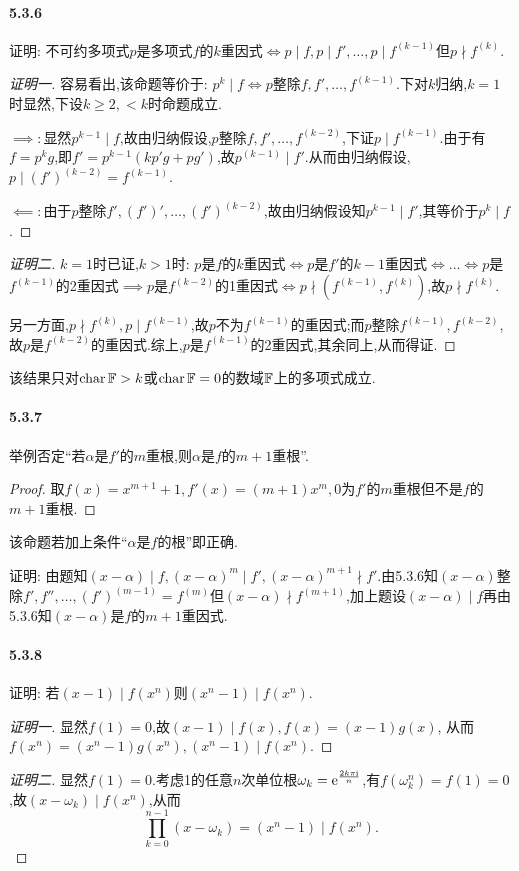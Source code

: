 \documentclass[11pt]{article}
\begin{document}
\paragraph{5.3.6}证明: 不可约多项式$p$是多项式$f$的$k$重因式$\iff p\mid f, p\mid f',\dots,p\mid f^{(k-1)}$但$p\nmid f^{(k)}$.
\begin{proof}[证明一]
    容易看出,该命题等价于: $p^k\mid f \iff p$整除$f, f',\dots, f^{(k-1)}$.下对$k$归纳,$k=1$时显然,下设$k\geq 2, <k$时命题成立.

    $\implies:$显然$p^{k-1}\mid f$,故由归纳假设,$p$整除$f,f',\dots,f^{(k-2)}$,下证$p\mid f^{(k-1)}$.由于有$f=p^kg$,即$f'=p^{k-1}(kp'g+pg')$,故$p^{(k-1)}\mid f'$.从而由归纳假设,$p\mid (f')^{(k-2)}=f^{(k-1)}$.
    
    $\impliedby:$由于$p$整除$f',(f')',\dots,(f')^{(k-2)}$,故由归纳假设知$p^{k-1}\mid f'$,其等价于$p^k\mid f$.
\end{proof}
\begin{proof}[证明二]
    $k=1$时已证,$k>1$时: $p$是$f$的$k$重因式$\iff p$是$f'$的$k-1$重因式$\iff\dots\iff p$是$f^{(k-1)}$的2重因式$\implies p$是$f^{(k-2)}$的1重因式$\iff p\nmid (f^{(k-1)},f^{(k)})$,故$p\nmid f^{(k)}$.

    另一方面,$p\nmid f^{(k)}, p\mid f^{(k-1)}$,故$p$不为$f^{(k-1)}$的重因式;而$p$整除$f^{(k-1)},f^{(k-2)}$,故$p$是$f^{(k-2)}$的重因式.综上,$p$是$f^{(k-1)}$的2重因式,其余同上,从而得证.
\end{proof}
\begin{remark}
    该结果只对$\operatorname{char}\mathbb{F}>k$或$\operatorname{char}\mathbb{F}=0$的数域$\mathbb{F}$上的多项式成立.
\end{remark}
\paragraph{5.3.7}举例否定``若$\alpha$是$f'$的$m$重根,则$\alpha$是$f$的$m+1$重根''.
\begin{proof}
    取$f(x)=x^{m+1}+1, f'(x)=(m+1)x^m, 0$为$f'$的$m$重根但不是$f$的$m+1$重根.
\end{proof}
\begin{remark}
    该命题若加上条件``$\alpha$是$f$的根''即正确.

    证明: 由题知$(x-\alpha)\mid f, (x-\alpha)^m\mid f', (x-\alpha)^{m+1}\nmid f'$.由5.3.6知$(x-\alpha)$整除$f', f'', \dots, (f')^{(m-1)}=f^{(m)}$但$(x-\alpha)\nmid f^{(m+1)}$,加上题设$(x-\alpha)\mid f$再由5.3.6知$(x-\alpha)$是$f$的$m+1$重因式.
\end{remark}
\paragraph{5.3.8}证明: 若$(x-1)\mid f(x^n)$则$(x^n-1)\mid f(x^n)$.
\begin{proof}[证明一]
    显然$f(1)=0$,故$(x-1)\mid f(x), f(x)=(x-1)g(x)$, 从而$f(x^n)=(x^n-1)g(x^n), (x^n-1)\mid f(x^n)$.
\end{proof}
\begin{proof}[证明二]
    显然$f(1)=0$.考虑1的任意$n$次单位根$\omega_k=\mathrm{e}^{\frac{2k\pi\mathrm{i}}{n}}$,有$f(\omega_k^n)=f(1)=0$,故$(x-\omega_k)\mid f(x^n)$,从而
    $$\prod_{k=0}^{n-1}(x-\omega_k)=(x^n-1)\mid f(x^n).$$
\end{proof}
\end{document}
